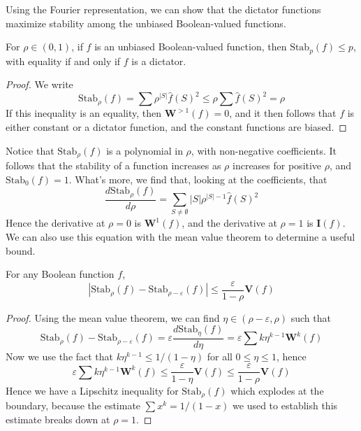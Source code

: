 Using the Fourier representation, we can show that the dictator functions maximize stability among the unbiased Boolean-valued functions.

\begin{theorem}
    For $\rho \in (0,1)$, if $f$ is an unbiased Boolean-valued function, then $\text{Stab}_p(f) \leq p$, with equality if and only if $f$ is a dictator.
\end{theorem}
\begin{proof}
    We write
    \[ \text{Stab}_\rho(f) = \sum \rho^{|S|} \widehat{f}(S)^2 \leq \rho \sum \widehat{f}(S)^2 = \rho \]
    If this inequality is an equality, then $\mathbf{W}^{> 1}(f) = 0$, and it then follows that $f$ is either constant or a dictator function, and the constant functions are biased.
\end{proof}

Notice that $\text{Stab}_\rho(f)$ is a polynomial in $\rho$, with non-negative coefficients. It follows that the stability of a function increases as $\rho$ increases for positive $\rho$, and $\text{Stab}_0(f) = 1$. What's more, we find that, looking at the coefficients, that
%
\[ \frac{d\text{Stab}_\rho(f)}{d\rho} = \sum_{S \neq \emptyset} |S| \rho^{|S| - 1} \widehat{f}(S)^2 \]
%
Hence the derivative at $\rho = 0$ is $\mathbf{W}^1(f)$, and the derivative at $\rho = 1$ is $\mathbf{I}(f)$. We can also use this equation with the mean value theorem to determine a useful bound.

\begin{theorem}
    For any Boolean function $f$,
    \[ |\text{Stab}_\rho(f) - \text{Stab}_{\rho - \varepsilon}(f)| \leq \frac{\varepsilon}{1 - \rho} \mathbf{V}(f) \]
\end{theorem}
\begin{proof}
    Using the mean value theorem, we can find $\eta \in (\rho - \varepsilon, \rho)$ such that
    \[ \text{Stab}_\rho(f) - \text{Stab}_{\rho - \varepsilon}(f) = \varepsilon \frac{d \text{Stab}_\eta(f)}{d \eta} = \varepsilon \sum k \eta^{k - 1} \mathbf{W}^k(f) \]
    Now we use the fact that $k \eta^{k-1} \leq 1/(1 - \eta)$ for all $0 \leq \eta \leq 1$, hence
    \[ \varepsilon \sum k \eta^{k-1} \mathbf{W}^k(f) \leq \frac{\varepsilon}{1 - \eta} \mathbf{V}(f) \leq \frac{\varepsilon}{1 - \rho} \mathbf{V}(f) \]
    Hence we have a Lipschitz inequality for $\text{Stab}_\rho(f)$ which explodes at the boundary, because the estimate $\sum x^k = 1/(1 - x)$ we used to establish this estimate breaks down at $\rho = 1$.
\end{proof}

